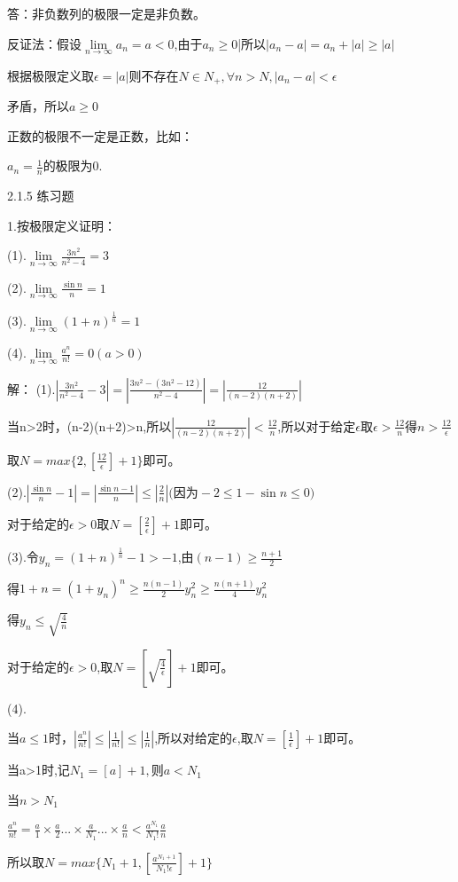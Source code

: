 \documentclass[12pt]{ctexart}
\begin{document}
答：非负数列的极限一定是非负数。

反证法：假设$\lim\limits_{n\to\infty}a_n=a<0$,由于$a_n\ge$0|所以$|a_n-a|=a_n+|a|\ge|a|$

根据极限定义取$\epsilon=|a|$则不存在$N\in{N_+},\forall{n}>N,|a_n-a|<\epsilon$

矛盾，所以$a\ge0$

正数的极限不一定是正数，比如：

$a_n=\frac{1}{n}$的极限为0.

2.1.5 练习题

1.按极限定义证明：

(1).$\lim\limits_{n\to\infty}\frac{3n^2}{n^2-4}=3$

(2).$\lim\limits_{n\to\infty}\frac{\sin{n}}{n}=1$

(3).$\lim\limits_{n\to\infty}{(1+n)^{\frac{1}{n}}}=1$

(4).$\lim\limits_{n\to\infty}\frac{a^n}{n!}=0(a>0)$

解：
(1).$|\frac{3n^2}{n^2-4}-3|=|\frac{3n^2-(3n^2-12)}{n^2-4}|=|\frac{12}{(n-2)(n+2)}|$

当n>2时，(n-2)(n+2)>n,所以$|\frac{12}{(n-2)(n+2)}|<\frac{12}{n}$,所以对于给定$\epsilon$取$\epsilon>\frac{12}{n}\textrm{得}n>\frac{12}{\epsilon}$

取$N=max\{2,[\frac{12}{\epsilon}]+1\}$即可。

(2).$|\frac{\sin{n}}{n}-1|=|\frac{\sin{n}-1}{n}|\le|\frac{2}{n}|\textrm{(因为}-2\le{1-\sin{n}}\le0)$

对于给定的$\epsilon>0$取$N=[\frac{2}{\epsilon}]+1$即可。

(3).令$y_n={(1+n)^{\frac{1}{n}}}-1>-1$,由$(n-1)\ge\frac{n+1}{2}$

得$1+n={(1+y_n)}^n\ge\frac{n(n-1)}{2}y_n^2\ge\frac{n(n+1)}{4}y_n^2$

得$y_n\le\sqrt{\frac{4}{n}}$

对于给定的$\epsilon>0$,取$N=[\sqrt{\frac{4}{\epsilon}}]+1$即可。

(4).

当$a\le1$时，$|\frac{a^n}{n!}|\le|\frac{1}{n!}|\le|\frac{1}{n}|$,所以对给定的$\epsilon$,取$N=[\frac{1}{\epsilon}]+1$即可。

当a>1时,记$N_1=[a]+1,\textrm{则}a<N_1$

当$n>N_1$

$\frac{a^n}{n!}=\frac{a}{1}\times\frac{a}{2}...\times\frac{a}{N_1}...\times\frac{a}{n}<\frac{a^{N_1}}{N_1!}\frac{a}{n}$

所以取$N=max\{N_1+1,[\frac{a^{N_1+1}}{N_1!\epsilon}]+1\}$
\end{document}
